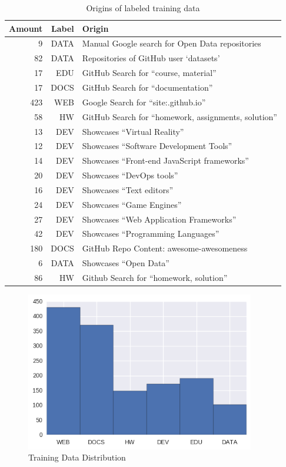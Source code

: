 \begin{table}[h]
\centering
\label{data_sources}
\caption{Origins of labeled training data}
\begin{tabular}{|r|r|l|}
\hline
Amount & Label & Origin \\ \hline
9 & DATA & Manual Google search for Open Data
repositories \\ \hline
82 & DATA & Repositories of GitHub user `datasets' \\ \hline
17 & EDU & GitHub Search for ``course, material'' \\ \hline
17 & DOCS & GitHub Search for ``documentation'' \\ \hline
423 & WEB & Google Search for ``site:.github.io'' \\ \hline
58 & HW & GitHub Search for ``homework, assignments,
solution'' \\ \hline
13 & DEV & Showcases ``Virtual Reality'' \\ \hline
12 & DEV & Showcases ``Software Development Tools'' \\ \hline
14 & DEV & Showcases ``Front-end JavaScript frameworks'' \\ \hline
20 & DEV & Showcases ``DevOps tools'' \\ \hline
16 & DEV & Showcases ``Text editors'' \\ \hline
24 & DEV & Showcases ``Game Engines'' \\ \hline
27 & DEV & Showcases ``Web Application Frameworks'' \\ \hline
42 & DEV & Showcases ``Programming Languages'' \\ \hline
180 & DOCS & GitHub Repo Content: awesome-awesomeness \\ \hline
6 & DATA & Showcases ``Open Data'' \\ \hline
86 & HW & Github Search for ``homework, solution'' \\ \hline
\end{tabular}
\end{table}

\begin{figure}[h]
	\centering
		\includegraphics[width=10cm]{graphics/training_data_distribution.png}
	\caption{Training Data Distribution}
	\label{training_data_distribution}
\end{figure}


